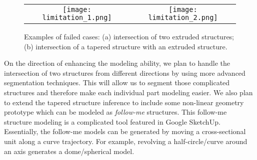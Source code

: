 \begin{figure} [htbp]
\begin{center}
\begin{tabular}{cc}
\texttt{[image: limitation\_1.png]} &
\texttt{[image: limitation\_2.png]}
\end{tabular}
\end{center}
\caption{Examples of failed cases:
      (a) intersection of two extruded structures;
      (b) intersection of a tapered structure with an extruded structure.}
\label{fig:ER_Lmt}
\end{figure}

On the direction of enhancing the modeling ability,
we plan to handle the intersection of two structures
from different directions
by using more advanced segmentation techniques.
This will allow us to segment those complicated structures
and therefore make each individual part modeling easier.
We also plan to extend the tapered structure inference
to include some non-linear geometry prototype
which can be modeled as {\it follow-me} structures.
This follow-me structure modeling
is a complicated tool featured in Google SketchUp.
Essentially, the follow-me models can be generated by
moving a cross-sectional unit along a curve trajectory.
For example, revolving a half-circle/curve around an axis
generates a dome/spherical model.

